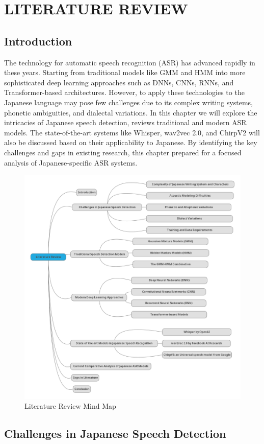 \chapter{LITERATURE REVIEW}

\section{Introduction}
The technology for automatic speech recognition (ASR) has advanced rapidly in these years. Starting from traditional models like GMM and HMM into more sophisticated deep learning approaches such as DNNs, CNNs, RNNs, and Transformer-based architectures. However, to apply these technologies to the Japanese language may pose few challenges due to its complex writing systems, phonetic ambiguities, and dialectal variations. In this chapter we will explore the intricacies of Japanese speech detection, reviews traditional and modern ASR models. The state-of-the-art systems like Whisper, wav2vec 2.0, and ChirpV2 will also be discussed based on their applicability to Japanese. By identifying the key challenges and gaps in existing research, this chapter prepared for a focused analysis of Japanese-specific ASR systems.
\begin{figure}[!ht]
    \centering
    \includegraphics[width=.7\textwidth]{mainmatter//images/mindmap.png}
    \caption{Literature Review Mind Map}
\end{figure}

\section{Challenges in Japanese Speech Detection}
